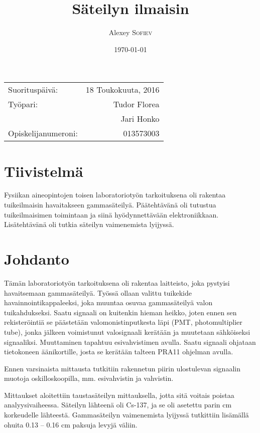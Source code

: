\documentclass[a4paper, 12pt]{article}
\title{Säteilyn ilmaisin} %
\author{Alexey \textsc{Sofiev}} %
\date{\today} %
\begin{document}
\maketitle %

\begin{center}
\begin{tabular}{l r}
Suorituspäivä: & 18 Toukokuuta, 2016 \\ %
Työpari: & Tudor Florea \\ %
& Jari Honko \\
Opiskelijanumeroni: & 013573003 %
\end{tabular}
\end{center}

\clearpage
\section{Tiivistelmä}

Fysiikan aineopintojen toisen laboratoriotyön tarkoituksena oli rakentaa tuikeilmaisin havaitakseen gammasäteilyä. Päätehtävänä oli tutustua tuikeilmaisimen toimintaan ja siinä hyödynnettävään elektroniikkaan. Lisätehtävänä oli tutkia säteilyn vaimenemista lyijyssä.

\clearpage

\section{Johdanto}

Tämän laboratoriotyön tarkoituksena oli rakentaa laitteisto, joka pystyisi havaitsemaan gammasäteilyä. Työssä ollaan valittu tuikekide havainnointikappaleeksi, joka muuntaa osuvaa gammasäteilyä valon tuikahdukseksi. Saatu signaali on kuitenkin hieman heikko, joten ennen sen rekisteröintiä se päästetään valomonistinputkesta läpi (PMT, photomultiplier tube), jonka jälkeen voimistunut valosignaali kerätään ja muutetaan sähköiseksi signaaliksi. Muuttaminen tapahtuu esivahvistimen avulla. Saatu signaali ohjataan tietokoneen äänikortille, josta se kerätään talteen PRA11 ohjelman avulla.

Ennen varsinaista mittausta tutkitiin rakennetun piirin ulostulevan signaalin muotoja oskilloskoopilla, mm. esivahvistin ja vahvistin.

Mittaukset aloitettiin taustasäteilyn mittauksella, jotta sitä voitais poistaa analyysivaiheessa. Säteilyn lähteenä oli Cs-137, ja se oli asetettu parin cm korkeudelle lähteestä. Gammasäteilyn vaimenemista lyijyssä tutkittiin lisämällä ohuita 0.13 -- 0.16 cm paksuja levyjä väliin.
\end{document}
